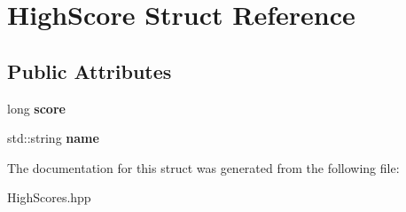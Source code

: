\hypertarget{struct_high_score}{}\section{High\+Score Struct Reference}
\label{struct_high_score}
\subsection*{Public Attributes}
\begin{DoxyCompactItemize}
\item 
\mbox{\label{struct_high_score_ac6e9240847382cb4b430acaf13cab5ec}} 
long {\bfseries score}
\item 
\mbox{\label{struct_high_score_a00c6a815ab4ae8593309f177165bc652}} 
std\+::string {\bfseries name}
\end{DoxyCompactItemize}


The documentation for this struct was generated from the following file\+:\begin{DoxyCompactItemize}
\item 
High\+Scores.\+hpp\end{DoxyCompactItemize}

